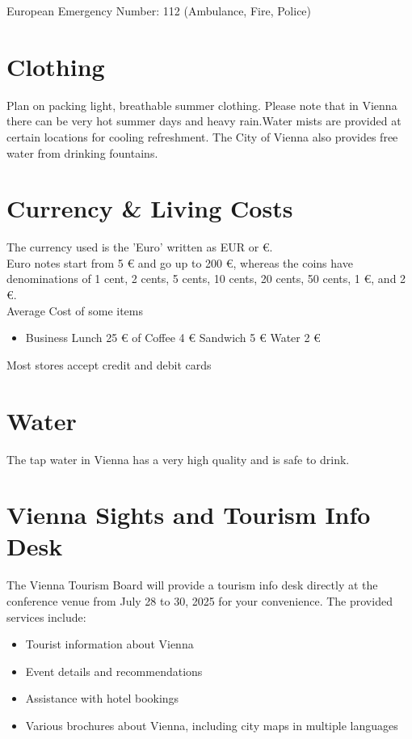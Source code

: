 European Emergency Number: 112 (Ambulance, Fire, Police)

\section*{Clothing}

Plan on packing light, breathable summer clothing. Please note that in Vienna there can be very hot summer days and heavy rain.Water mists are provided at certain locations for cooling refreshment. The City of Vienna also provides free water from drinking fountains.

\section*{Currency & Living Costs}

The currency used is the 'Euro’ written as EUR or €.\\

Euro notes start from 5 € and go up to 200 €, whereas the coins have denominations of 1 cent, 2 cents, 5 cents, 10 cents, 20 cents, 50 cents, 1 €, and 2 €.\\

Average Cost of some items
\begin{itemize}
\item Business Lunch  25 €
\itemCup of Coffee  4 €
\itemFilled Sandwich  5 €
\itemMineral Water  2 €
\end{itemize}

Most stores accept credit and debit cards

\section*{Water}
The tap water in Vienna has a very high quality and is safe to drink.

\section*{Vienna Sights and Tourism Info Desk}

The Vienna Tourism Board will provide a tourism info desk directly at the conference venue from July 28 to 30, 2025 for your convenience. The provided services include:

\begin{itemize}

\item Tourist information about Vienna
\item Event details and recommendations
\item Assistance with hotel bookings
\item Various brochures about Vienna, including city maps in multiple languages

\end{itemize}

